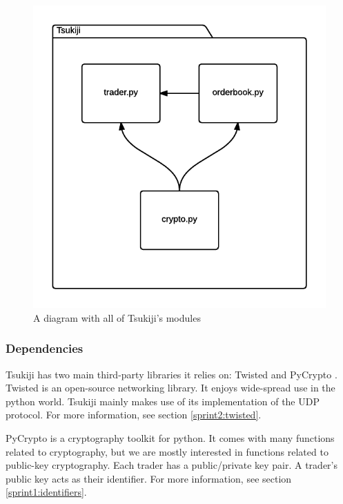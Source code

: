 \begin{figure}[H]
  \centering
  \includegraphics[width=\textwidth]{modules}
  \caption{A diagram with all of Tsukiji's modules}
  \label{modulesfig}
\end{figure}

\subsubsection{Dependencies}
\label{dependencies}
Tsukiji has two main third-party libraries it relies on: Twisted \cite{twisted} and PyCrypto \cite{pycrypto}.
Twisted is an open-source networking library.
It enjoys wide-spread use in the python world.
Tsukiji mainly makes use of its implementation of the UDP protocol.
For more information, see section \ref{sprint2:twisted}.

PyCrypto is a cryptography toolkit for python.
It comes with many functions related to cryptography, but we are mostly interested in functions related to public-key cryptography.
Each trader has a public/private key pair.
A trader's public key acts as their identifier.
For more information, see section \ref{sprint1:identifiers}.

